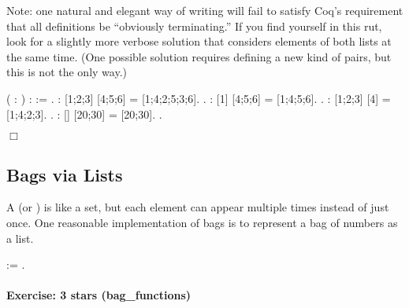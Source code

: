 \documentclass[12pt]{report}
\begin{document}
    Note: one natural and elegant way of writing  will fail
    to satisfy Coq's requirement that all  definitions be
    ``obviously terminating.''  If you find yourself in this rut, look
    for a slightly more verbose solution that considers elements of
    both lists at the same time.  (One possible solution requires
    defining a new kind of pairs, but this is not the only way.)  \begin{coqdoccode}
\coqdocemptyline
\coqdocnoindent
{}  (  : ) :  :=\coqdoceol
\coqdocindent{1.00em}
 .\coqdoceol
\coqdocemptyline
\coqdocnoindent
{} :         [1;2;3] [4;5;6] = [1;4;2;5;3;6].\coqdoceol
 .\coqdoceol
\coqdocnoindent
{} :         [1] [4;5;6] = [1;4;5;6].\coqdoceol
 .\coqdoceol
\coqdocnoindent
{} :         [1;2;3] [4] = [1;4;2;3].\coqdoceol
 .\coqdoceol
\coqdocnoindent
{} :         [] [20;30] = [20;30].\coqdoceol
 .\coqdoceol
\end{coqdoccode}
\ensuremath{\Box} \begin{coqdoccode}
\coqdocemptyline
\end{coqdoccode}
\subsection{Bags via Lists}



 A  (or ) is like a set, but each element can appear
    multiple times instead of just once.  One reasonable
    implementation of bags is to represent a bag of numbers as a
    list. \begin{coqdoccode}
\coqdocemptyline
\coqdocnoindent
{}  := .\coqdoceol
\coqdocemptyline
\end{coqdoccode}
\paragraph{Exercise: 3 stars (bag\_functions)}
\end{document}
